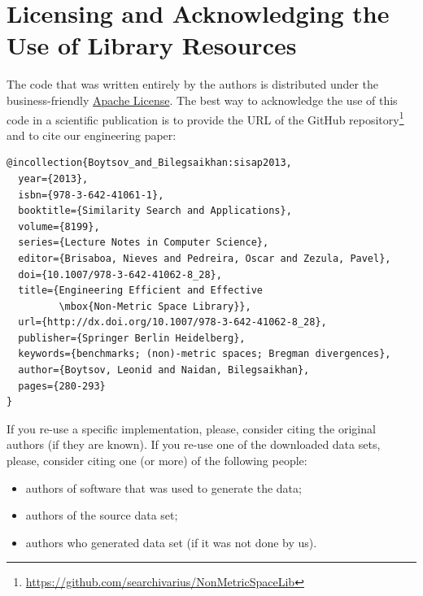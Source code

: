 \documentclass[runningheads,a4paper]{llncs}
\begin{document}
\section{Licensing and Acknowledging the Use of Library Resources}\label{SectionCredits}
The code that was written entirely by the authors is distributed 
under the business-friendly \href{http://apache.org/licenses/LICENSE-2.0}{Apache License}. 
The best way to acknowledge the use of this code 
in a scientific publication is to 
provide the URL of the GitHub repository\footnote{\url{https://github.com/searchivarius/NonMetricSpaceLib}} 
and to cite our engineering paper:

\begin{verbatim}
@incollection{Boytsov_and_Bilegsaikhan:sisap2013,
  year={2013},
  isbn={978-3-642-41061-1},
  booktitle={Similarity Search and Applications},
  volume={8199},
  series={Lecture Notes in Computer Science},
  editor={Brisaboa, Nieves and Pedreira, Oscar and Zezula, Pavel},
  doi={10.1007/978-3-642-41062-8_28},
  title={Engineering Efficient and Effective 
         \mbox{Non-Metric Space Library}},
  url={http://dx.doi.org/10.1007/978-3-642-41062-8_28},
  publisher={Springer Berlin Heidelberg},
  keywords={benchmarks; (non)-metric spaces; Bregman divergences},
  author={Boytsov, Leonid and Naidan, Bilegsaikhan},
  pages={280-293}
}
\end{verbatim}


If you re-use a specific implementation, please,
consider citing the original authors (if they are known).
If you re-use one of the downloaded data sets,
please, consider citing one (or more) of the following people:
\begin{itemize}
\item authors of software that was used to generate the data;
\item authors of the source data set;
\item authors who generated data set (if it was not done by us).
\end{itemize}
\end{document}
